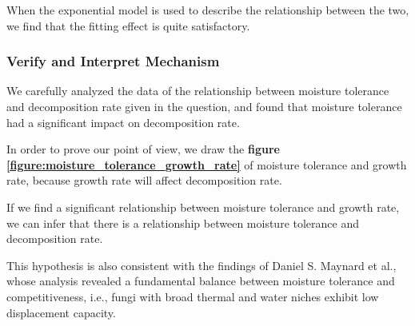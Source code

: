 \documentclass[12pt]{article}
\begin{document}
When the exponential model is used to describe the relationship between the two, we find that the fitting effect is quite satisfactory.



\subsubsection{Verify and Interpret Mechanism}

We carefully analyzed the data of the relationship between moisture tolerance and decomposition rate given in the question, and found that moisture tolerance had a significant impact on decomposition rate. \par 

In order to prove our point of view, we draw the \textbf{figure \ref{figure:moisture_tolerance_growth_rate}} of moisture tolerance and growth rate, because growth rate will affect decomposition rate.\par

If we find a significant relationship between moisture tolerance and growth rate, we can infer that there is a relationship between moisture tolerance and decomposition rate. \par 

This hypothesis is also consistent with the findings of Daniel S. Maynard et al.\cite{3}, whose analysis revealed a fundamental balance between moisture tolerance and competitiveness, i.e., fungi with broad thermal and water niches exhibit low displacement capacity.\par
\end{document}
